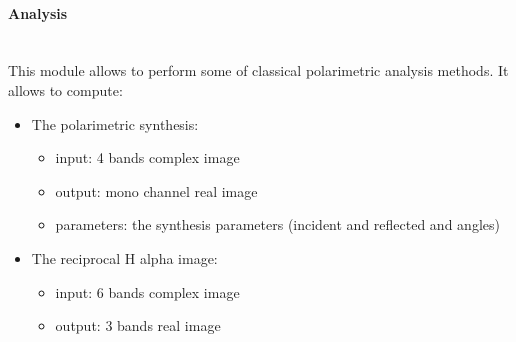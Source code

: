\paragraph{Analysis} \\

This module allows to perform some of classical polarimetric analysis methods. It allows to compute:
\begin{itemize}
\item The polarimetric synthesis:
\begin{itemize}
\item input: 4 bands complex image
\item output: mono channel real image 
\item parameters: the synthesis parameters (incident and reflected \psy and \khi angles)
\end{itemize}
\item The reciprocal H alpha image:
\begin{itemize}
\item input: 6 bands complex image
\item output: 3 bands real image 
\end{itemize}
\end{itemize}

